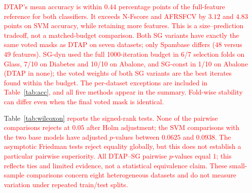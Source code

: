 \documentclass[]{interact}
\theoremstyle{plain}
\theoremstyle{definition}
\theoremstyle{remark}
\begin{document}
\leavevmode\textcolor{red}{DTAP's mean accuracy is within $0.44$ percentage points of the full-feature
reference for both classifiers. It exceeds N-Fscore and AFRSFCV by $3.12$
and $4.83$ points on SVM accuracy, while retaining more features.
This is a size--prediction tradeoff, not a matched-budget comparison.
Both SG variants have exactly the same voted masks as DTAP on seven datasets;
only Spambase differs ($48$ versus $49$ features).
SG-dyn used the full 1000-iteration budget in 6/7 selection folds on Glass,
7/10 on Diabetes and 10/10 on Abalone, and SG-const in 1/10 on Abalone
(DTAP in none); the voted weights of both SG variants are the best iterates
found within the budget. The per-dataset exceptions
are included in Table~\ref{tab:acc}, and all five methods appear in the summary.
Fold-wise stability can differ even when the final voted mask is identical.}

Table~\leavevmode\textcolor{red}{\ref{tab:wilcoxon} reports the signed-rank tests. None of the pairwise
comparisons rejects at $0.05$ after Holm adjustment; the SVM comparisons with
the two base models have adjusted $p$-values between $0.0625$ and $0.0938$.
The asymptotic Friedman tests reject equality globally, but this does not establish
a particular pairwise superiority. All DTAP--SG pairwise $p$-values equal $1$;
this reflects ties and limited evidence, not a statistical equivalence claim.
These small-sample comparisons concern eight heterogeneous datasets and do not
measure variation under repeated train/test splits.}
\end{document}
